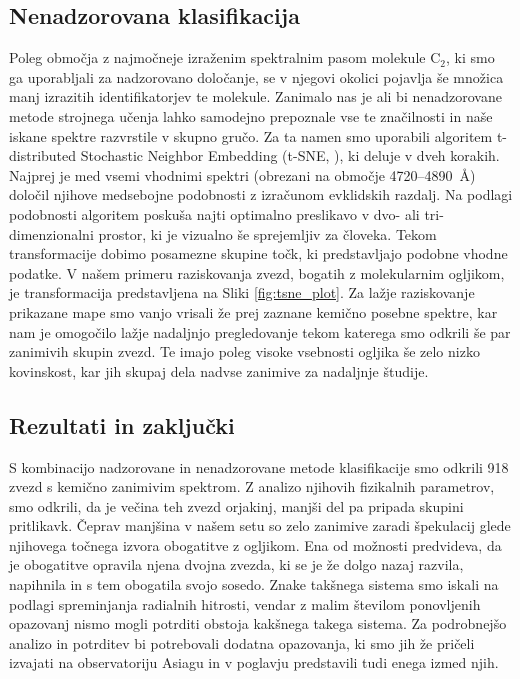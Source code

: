 \subsection{Nenadzorovana klasifikacija}
Poleg območja z najmočneje izraženim spektralnim pasom molekule C$_{2}$, ki smo ga uporabljali za nadzorovano določanje, se v njegovi okolici pojavlja še množica manj izrazitih identifikatorjev te molekule. Zanimalo nas je ali bi nenadzorovane metode strojnega učenja lahko samodejno prepoznale vse te značilnosti in naše iskane spektre razvrstile v skupno gručo. Za ta namen smo uporabili algoritem t-distributed Stochastic Neighbor Embedding (t-SNE, \cite{van2008visualizing}), ki deluje v dveh korakih. Najprej je med vsemi vhodnimi spektri (obrezani na območje 4720--4890~\AA) določil njihove medsebojne podobnosti z izračunom evklidskih razdalj. Na podlagi podobnosti algoritem poskuša najti optimalno preslikavo v dvo- ali tri-dimenzionalni prostor, ki je vizualno še sprejemljiv za človeka. Tekom transformacije dobimo posamezne skupine točk, ki predstavljajo podobne vhodne podatke. V našem primeru raziskovanja zvezd, bogatih z molekularnim ogljikom, je transformacija predstavljena na Sliki \ref{fig:tsne_plot}. Za lažje raziskovanje prikazane mape smo vanjo vrisali že prej zaznane kemično posebne spektre, kar nam je omogočilo lažje nadaljnjo pregledovanje tekom katerega smo odkrili še par zanimivih skupin zvezd. Te imajo poleg visoke vsebnosti ogljika še zelo nizko kovinskost, kar jih skupaj dela nadvse zanimive za nadaljnje študije.

\subsection{Rezultati in zaključki}
S kombinacijo nadzorovane in nenadzorovane metode klasifikacije smo odkrili 918 zvezd s kemično zanimivim spektrom. Z analizo njihovih fizikalnih parametrov, smo odkrili, da je večina teh zvezd orjakinj, manjši del pa pripada skupini pritlikavk. Čeprav manjšina v našem setu so zelo zanimive zaradi špekulacij glede njihovega točnega izvora obogatitve z ogljikom. Ena od možnosti predvideva, da je obogatitve opravila njena dvojna zvezda, ki se je že dolgo nazaj razvila, napihnila in s tem obogatila svojo sosedo. Znake takšnega sistema smo iskali na podlagi spreminjanja radialnih hitrosti, vendar z malim številom ponovljenih opazovanj nismo mogli potrditi obstoja kakšnega takega sistema. Za podrobnejšo analizo in potrditev bi potrebovali dodatna opazovanja, ki smo jih že pričeli izvajati na observatoriju Asiagu in v poglavju predstavili tudi enega izmed njih.

